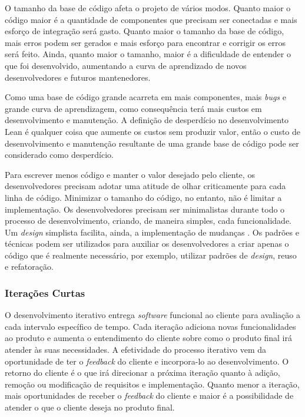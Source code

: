 O tamanho da base de código afeta o projeto de vários modos. Quanto maior o código maior é a quantidade de componentes que precisam ser conectadas e mais esforço de integração será gasto. Quanto maior o tamanho da base de código, mais erros podem ser gerados e mais esforço para encontrar e corrigir os erros será feito. Ainda, quanto maior o tamanho, maior é a dificuldade de entender o que foi desenvolvido, aumentando a curva de aprendizado de novos desenvolvedores e futuros mantenedores.  

Como uma base de código grande acarreta em mais componentes, mais \textit{bugs} e grande curva de aprendizagem, como consequência terá mais custos em desenvolvimento e manutenção. A definição de desperdício no desenvolvimento Lean é qualquer coisa que aumente os custos sem produzir valor, então o custo de desenvolvimento e manutenção resultante de uma grande base de código pode ser considerado como desperdício. 

Para escrever menos código e manter o valor desejado pelo cliente, os desenvolvedores precisam adotar uma atitude de olhar criticamente para cada linha de código. Minimizar o tamanho do código, no entanto, não é limitar a implementação. Os desenvolvedores precisam ser minimalistas durante todo o processo de desenvolvimento, criando, de maneira simples, cada funcionalidade. Um \textit{design} simplista facilita, ainda, a implementação de mudanças \cite{hibbs2009}. Os padrões e técnicas podem ser utilizados para auxiliar os desenvolvedores a criar apenas o código que é realmente necessário, por exemplo, utilizar padrões de \textit{design}, reuso e refatoração.

\subsubsection[Iterações Curtas]{Iterações Curtas}

O desenvolvimento iterativo entrega \textit{software} funcional ao cliente para avaliação a cada intervalo específico de tempo. Cada iteração adiciona novas funcionalidades ao produto e aumenta o entendimento do cliente sobre como o produto final irá atender às suas necessidades. A efetividade do processo iterativo vem da oportunidade de ter o \textit{feedback} do cliente e incorpora-lo ao desenvolvimento. O retorno do cliente é o que irá direcionar a próxima iteração quanto à adição, remoção ou modificação de requisitos e implementação. Quanto menor a iteração, mais oportunidades de receber o \textit{feedback} do cliente e maior é a possibilidade de atender o que o cliente deseja no produto final. 

